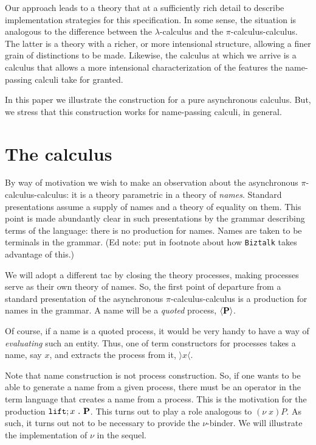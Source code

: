 \documentclass{amsart}
\newcommand{\id}[1]{\texttt{#1}}
\newcommand{\concat}{\mathbin{\id{.}}}
\newcommand{\category}[1]{\mbox{\bf #1}}
\theoremstyle{definition}
\theoremstyle{remark}
\numberwithin{equation}{subsection}
\newcommand{\lpquote}{\langle}
\newcommand{\rpquote}{\rangle}
\newcommand{\pic}{$\pi$-calculus}
\begin{document}
Our approach leads to a theory that at a sufficiently rich detail to
describe implementation strategies for this specification. In some
sense, the situation is analogous to the difference between the
$\lambda$-calculus and the \pic-calculus. The latter is a theory with
a richer, or more intensional structure, allowing a finer grain of
distinctions to be made. Likewise, the calculus at which we arrive is
a calculus that allows a more intensional characterization of the
features the name-passing calculi take for granted.

In this paper we illustrate the construction for a pure asynchronous
calculus. But, we stress that this construction works for name-passing
calculi, in general. 


\section{The calculus}

By way of motivation we wish to make an observation about the
asynchronous \pic-calculus: it is a theory parametric in a theory of
\textit{names}. Standard presentations assume a supply of names and a
theory of equality on them. This point is made abundantly clear in
such presentations by the grammar describing terms of the language:
there is no production for names. Names are taken to be terminals in
the grammar. (Ed note: put in footnote about how \texttt{Biztalk} takes
advantage of this.)

We will adopt a different tac by closing the theory processes, making
processes serve as their own theory of names. So, the first point of
departure from a standard presentation of the asynchronous
\pic-calculus is a production for names in the grammar. A name will
be a \textit{quoted} process, $\lpquote \category{P} \rpquote$. 

Of course, if a name is a quoted process, it would be very handy to
have a way of \textit{evaluating} such an entity. Thus, one of term
constructors for processes takes a name, say $x$, and extracts the
process from it, $\rpquote x \lpquote$. 

Note that name construction is not process construction. So, if one
wants to be able to generate a name from a given process, there must
be an operator in the term language that creates a name from a
process. This is the motivation for the production $\texttt{lift} ; x \concat \category{P}$. This turns out to play a role analogous to
$(\nu \; x)P$. As such, it turns out not to be necessary to provide
the $\nu$-binder. We will illustrate the implementation of $\nu$ in
the sequel. 
\end{document}
